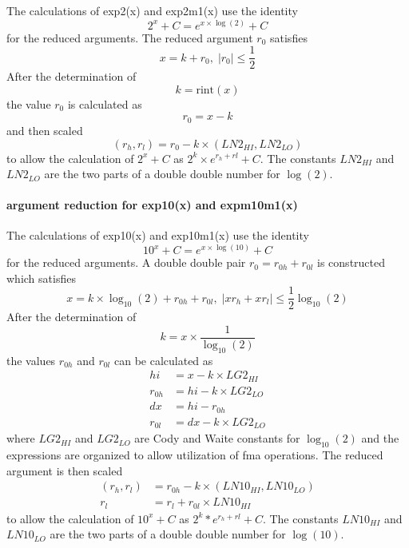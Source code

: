 \documentclass[10pt,a4paper,final,oneside]{article}
\numberwithin{equation}{subsection}
\begin{document}
    The calculations of exp2(x) and exp2m1(x) use the
    identity
    \begin{equation}
        2^x + C = e^{x \times \log{(2)}} + C
    \end{equation}
    for the reduced arguments.
    The reduced argument $ r_0 $ satisfies
    \begin{equation}
        x = k + r_0, \;
        |r_0| \le \frac{1}{2}
    \end{equation}
    After the determination of
    \[
        k = \text{rint}(x)
    \]
    the value $r_0$ is calculated as
    \[
       r_0 = x - k
    \]
    and then scaled
    \[
       (r_h, r_l) = r_0 - k \times (LN2_{HI}, LN2_{LO})
    \]
    to allow the calculation of $ 2^x + C $ as $ 2^k \times e^{r_h+ rl} + C$.
    The constants $LN2_{HI}$ and $LN2_{LO}$ are the two parts of a double double number for $\log{(2)}$.

\paragraph{argument reduction for exp10(x) and expm10m1(x)}

    The calculations of exp10(x) and exp10m1(x) use the
    identity
    \begin{equation}
        10^x + C = e^{x \times \log{(10)}} + C
    \end{equation}
    for the reduced arguments. A  double double pair $ r_0= r_{0h} + r_{0l} $ is constructed which satisfies
    \begin{equation}
        x = k \times \log_{10}{(2)} + r_{0h} + r_{0l}, \;
        |xr_h +xr_l| \le \frac{1}{2} \log_{10}{(2)}
    \end{equation}
    After the determination of
    \[
        k = x \times \frac{1}{\log_{10}{(2)}}
    \]
    the values $r_{0h}$ and $r_{0l}$ can be calculated as
    \[
       \begin{aligned}
       hi &= x - k \times LG2_{HI} \\
       r_{0h} &= hi - k \times LG2_{LO} \\
       dx & = hi - r_{0h} \\
       r_{0l} &= dx - k \times LG2_{LO}
       \end{aligned}
    \]
    where $LG2_{HI}$ and $LG2_{LO}$ are Cody and Waite constants for
    $\log_{10}{(2)}$
    and the expressions are organized to allow utilization of fma operations.
    The reduced argument is then scaled
    \[
        \begin{aligned}
        (r_h, r_l) &= r_{0h} - k \times (LN10_{HI}, LN10_{LO}) \\
        r_l &= r_l + r_{0l} \times LN10_{HI}
        \end{aligned}
    \]
    to allow the calculation of $ 10^x + C $ as $ 2^k * e^{r_h+ rl} + C$.
    The constants $LN10_{HI}$ and $LN10_{LO}$ are the two parts of a double double number for $\log(10)$.
\end{document}
